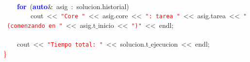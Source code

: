 \mbox{} \\
\mbox{}\ \ \ \ \textbf{\textcolor{Blue}{for}}\ \textcolor{BrickRed}{(}\textbf{\textcolor{Blue}{auto}}\textcolor{BrickRed}{\&}\ asig\ \textcolor{BrickRed}{:}\ solucion\textcolor{BrickRed}{.}historial\textcolor{BrickRed}{)} \\
\mbox{}\ \ \ \ \ \ \ \ cout\ \textcolor{BrickRed}{\textless{}\textless{}}\ \texttt{\textcolor{Red}{"{}Core\ "{}}}\ \textcolor{BrickRed}{\textless{}\textless{}}\ asig\textcolor{BrickRed}{.}core\ \textcolor{BrickRed}{\textless{}\textless{}}\ \texttt{\textcolor{Red}{"{}:\ tarea\ "{}}}\ \textcolor{BrickRed}{\textless{}\textless{}}\ asig\textcolor{BrickRed}{.}tarea\ \textcolor{BrickRed}{\textless{}\textless{}}\ \texttt{\textcolor{Red}{"{}\ (comenzando\ en\ "{}}}\ \textcolor{BrickRed}{\textless{}\textless{}}\ asig\textcolor{BrickRed}{.}t$\_$inicio\ \textcolor{BrickRed}{\textless{}\textless{}}\ \texttt{\textcolor{Red}{"{})"{}}}\ \textcolor{BrickRed}{\textless{}\textless{}}\ endl\textcolor{BrickRed}{;} \\
\mbox{} \\
\mbox{}\ \ \ \ cout\ \textcolor{BrickRed}{\textless{}\textless{}}\ \texttt{\textcolor{Red}{"{}Tiempo\ total:\ "{}}}\ \textcolor{BrickRed}{\textless{}\textless{}}\ solucion\textcolor{BrickRed}{.}t$\_$ejecucion\ \textcolor{BrickRed}{\textless{}\textless{}}\ endl\textcolor{BrickRed}{;} \\
\mbox{}\textcolor{Red}{\}} \\
\mbox{}

